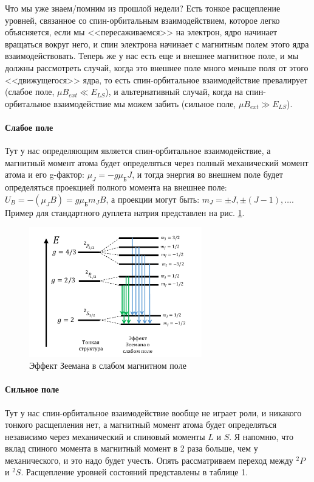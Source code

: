 \documentclass[12pt]{article}
\begin{document}
\vspace{1em} \noindent
Что мы уже знаем/помним из прошлой недели? Есть тонкое расщепление уровней, связанное со спин-орбитальным взаимодействием, которое легко объясняется, если мы <<пересаживаемся>> на электрон, ядро начинает вращаться вокруг него, и спин электрона начинает с магнитным полем этого ядра взаимодействовать. Теперь же у нас есть еще и внешнее магнитное поле, и мы должны рассмотреть случай, когда это внешнее поле много меньше поля от этого <<движущегося>> ядра, то есть спин-орбитальное взаимодействие превалирует (слабое поле, $\mu B_{ext} \ll E_{LS}$), и альтернативный случай, когда на спин-орбитальное взаимодействие мы можем забить (сильное поле, $\mu B_{ext} \gg E_{LS}$).

\paragraph{Слабое поле} Тут у нас определяющим является спин-орбитальное взаимодействие, а магнитный момент атома будет определяться через полный механический момент атома и его g-фактор: $\mu_J = -g\mu_{\text{Б}}J$, и тогда энергия во внешнем поле будет определяться проекцией полного момента на внешнее поле: $U_B = -(\mu_J B) = g\mu_{\text{Б}}m_JB$, а проекции могут быть: $m_J = \pm J, \pm (J-1), \dots$. Пример для стандартного дуплета натрия представлен на рис. \ref{fig:sem_08_weak_zeeman}.

\begin{figure}[h!]
    \centering
    \includegraphics[width=0.67\textwidth,height=\textheight,keepaspectratio]{Seminar_08/pics/pic_03.pdf}
    \caption{Эффект Зеемана в слабом магнитном поле}
    \label{fig:sem_08_weak_zeeman}
\end{figure}

\paragraph{Сильное поле} Тут у нас спин-орбитальное взаимодействие вообще не играет роли, и никакого тонкого расщепления нет, а магнитный момент атома будет определяться независимо через механический и спиновый моменты $L$ и $S$. Я напомню, что вклад спиного момента в магнитный момент в 2 раза больше, чем у механического, и это надо будет учесть. Опять рассматриваем переход между ${}^2P$ и ${}^2S$. Расщепление уровней состояний представлены в таблице 1.
\end{document}
